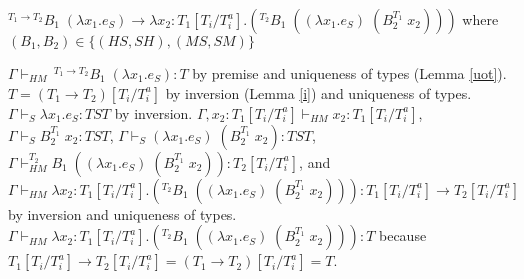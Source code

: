 \begin{case}
$^{T_{1}\rightarrow T_{2}}B_{1}\;(\lambda x_{1}.e_{S})\rightarrow\lambda x_{2}:T_{1}[T_{i}/T_{i}^{a}].(^{T_{2}}B_{1}\;((\lambda x_{1}.e_{S})\;(B_{2}^{T_{1}}\;x_{2})))$ where $(B_{1},B_{2})\in\lbrace(HS,SH),(MS,SM)\rbrace$

$\Gamma\vdash_{HM}\,^{T_{1}\rightarrow T_{2}}B_{1}\;(\lambda x_{1}.e_{S}):T$ by premise and uniqueness of types (Lemma \ref{uot}).  $T=(T_{1}\rightarrow T_{2})[T_{i}/T_{i}^{a}]$ by inversion (Lemma \ref{i}) and uniqueness of types.  $\Gamma\vdash_{S}\lambda x_{1}.e_{S}:TST$ by inversion.  $\Gamma,x_{2}:T_{1}[T_{i}/T_{i}^{a}]\vdash_{HM}x_{2}:T_{1}[T_{i}/T_{i}^{a}]$, $\Gamma\vdash_{S}B_{2}^{T_{1}}\;x_{2}:TST$, $\Gamma\vdash_{S}(\lambda x_{1}.e_{S})\;(B_{2}^{T_{1}}\;x_{2}):TST$, $\Gamma\vdash_{HM}^{T_{2}}B_{1}\;((\lambda x_{1}.e_{S})\;(B_{2}^{T_{1}}\;x_{2})):T_{2}[T_{i}/T_{i}^{a}]$, and $\Gamma\vdash_{HM}\lambda x_{2}:T_{1}[T_{i}/T_{i}^{a}].(^{T_{2}}B_{1}\;((\lambda x_{1}.e_{S})\;(B_{2}^{T_{1}}\;x_{2}))):T_{1}[T_{i}/T_{i}^{a}]\rightarrow T_{2}[T_{i}/T_{i}^{a}]$ by inversion and uniqueness of types.  $\Gamma\vdash_{HM}\lambda x_{2}:T_{1}[T_{i}/T_{i}^{a}].(^{T_{2}}B_{1}\;((\lambda x_{1}.e_{S})\;(B_{2}^{T_{1}}\;x_{2}))):T$ because $T_{1}[T_{i}/T_{i}^{a}]\rightarrow T_{2}[T_{i}/T_{i}^{a}]=(T_{1}\rightarrow T_{2})[T_{i}/T_{i}^{a}]=T$.
\end{case}